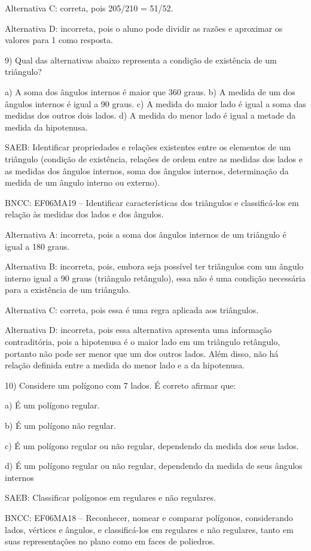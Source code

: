 Alternativa C: correta, pois 205/210 = 51/52.

Alternativa D: incorreta, pois o aluno pode dividir as razões e
aproximar os valores para 1 como resposta.

9) Qual das alternativas abaixo representa a condição de existência de
um triângulo?

a) A soma dos ângulos internos é maior que 360 graus. b) A medida de um
dos ângulos internos é igual a 90 graus. c) A medida do maior lado é
igual a soma das medidas dos outros dois lados. d) A medida do menor
lado é igual a metade da medida da hipotenusa.

SAEB: Identificar propriedades e relações existentes entre os elementos
de um triângulo (condição de existência, relações de ordem entre as
medidas dos lados e as medidas dos ângulos internos, soma dos ângulos
internos, determinação da medida de um ângulo interno ou externo).

BNCC: EF06MA19 -- Identificar características dos triângulos e
classificá-los em relação às medidas dos lados e dos ângulos.

Alternativa A: incorreta, pois a soma dos ângulos internos de um
triângulo é igual a 180 graus.

Alternativa B: incorreta, pois, embora seja possível ter triângulos com
um ângulo interno igual a 90 graus (triângulo retângulo), essa não é uma
condição necessária para a existência de um triângulo.

Alternativa C: correta, pois essa é uma regra aplicada aos triângulos.

Alternativa D: incorreta, pois essa alternativa apresenta uma informação
contraditória, pois a hipotenusa é o maior lado em um triângulo
retângulo, portanto não pode ser menor que um dos outros lados. Além
disso, não há relação definida entre a medida do menor lado e a da
hipotenusa.

10) Considere um polígono com 7 lados. É correto afirmar que:

a) É um polígono regular.

b) É um polígono não regular.

c) É um polígono regular ou não regular, dependendo da medida dos seus
lados.

d) É um polígono regular ou não regular, dependendo da medida de seus
ângulos internos

SAEB: Classificar polígonos em regulares e não regulares.

BNCC: EF06MA18 -- Reconhecer, nomear e comparar polígonos, considerando
lados, vértices e ângulos, e classificá-los em regulares e não
regulares, tanto em suas representações no plano como em faces de
poliedros.

